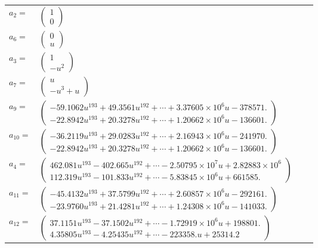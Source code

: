 \documentclass[1p]{elsarticle_modified}
\theoremstyle{definition}
\begin{document}
\begin{tabular}{m{7pt} m{180pt} m{7pt} m{180pt} }
\flushright $a_{2}=$&$\begin{pmatrix}1\\0\end{pmatrix}$ \\
\flushright $a_{6}=$&$\begin{pmatrix}0\\u\end{pmatrix}$ \\
\flushright $a_{3}=$&$\begin{pmatrix}1\\- u^2\end{pmatrix}$ \\
\flushright $a_{7}=$&$\begin{pmatrix}u\\- u^3+u\end{pmatrix}$ \\
\flushright $a_{9}=$&$\begin{pmatrix}-59.1062 u^{193}+49.3561 u^{192}+\cdots+3.37605\times10^{6} u-378571.\\-22.8942 u^{193}+20.3278 u^{192}+\cdots+1.20662\times10^{6} u-136601.\end{pmatrix}$ \\
\flushright $a_{10}=$&$\begin{pmatrix}-36.2119 u^{193}+29.0283 u^{192}+\cdots+2.16943\times10^{6} u-241970.\\-22.8942 u^{193}+20.3278 u^{192}+\cdots+1.20662\times10^{6} u-136601.\end{pmatrix}$ \\
\flushright $a_{4}=$&$\begin{pmatrix}462.081 u^{193}-402.665 u^{192}+\cdots-2.50795\times10^{7} u+2.82883\times10^{6}\\112.319 u^{193}-101.833 u^{192}+\cdots-5.83845\times10^{6} u+661585.\end{pmatrix}$ \\
\flushright $a_{11}=$&$\begin{pmatrix}-45.4132 u^{193}+37.5799 u^{192}+\cdots+2.60857\times10^{6} u-292161.\\-23.9760 u^{193}+21.4281 u^{192}+\cdots+1.24308\times10^{6} u-141033.\end{pmatrix}$ \\
\flushright $a_{12}=$&$\begin{pmatrix}37.1151 u^{193}-37.1502 u^{192}+\cdots-1.72919\times10^{6} u+198801.\\4.35805 u^{193}-4.25435 u^{192}+\cdots-223358. u+25314.2\end{pmatrix}$ \\

\end{tabular}
\end{document}
